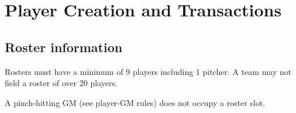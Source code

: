 
\section{Player Creation and Transactions}

\subsection{Roster information}
\begin{deepEnumerate}
	\item Rosters must have a minimum of 9 players including 1 pitcher.
	A team may not field a roster of over 20 players.
	\begin{deepEnumerate}
		\item A pinch-hitting GM (see player-GM rules) %
		does not occupy a roster slot.
	\end{deepEnumerate}
\end{deepEnumerate}


